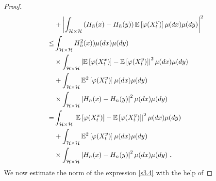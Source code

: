 \documentclass[review, onefignum, onetabnum]{siamart171218}
\begin{document}
\begin{proof}
\begin{equation}
\begin{aligned}
            &+
            \left|
                \int_{\mathcal{H}
                \times
                \mathcal{H}
                }
                \left(
                    H_{\bar n}(x) - H_{\bar n}(y)
                \right)
                \E\left[
                    \varphi(X_t ^ y)
                \right]
                \mu(dx)\mu(dy)
            \right|^2
            \\
            \le &
            \int_{\mathcal{H}\times \mathcal{H}}
                H_{\bar n}^2(x))
            \mu(dx)\mu(dy)
            \\
            &\times
                \int_{\mathcal{H}\times \mathcal{H}}
                \left|
                    \E\left [
                        \varphi(X_t^x)
                    \right]
                    -
                    \E\left[
                        \varphi(X_t^y)
                    \right]
                \right|^2
                \mu(dx)\mu(dy)
            \\
            &+
            \int_{\mathcal{H} \times \mathcal{H}}
                \E^2
                \left[
                    \varphi(X_t^y)
                \right]
            \mu(dx)\mu(dy)
            \\
             &\times
            \int_{\mathcal{H}\times \mathcal{H}}
            \left|
                H_{\bar n}(x)-H_{\bar n}(y)
            \right|^2
            \mu(dx)\mu(dy)
            \\
            =&
            \int_{\mathcal{H}\times \mathcal{H}}
            \left|
                    \E 
                    \left [
                        \varphi(X_t^x)
                    \right]
                    -
                    \E\left[
                        \varphi(X_t^y)
                    \right]
                \right|^2
                \mu(dx) \mu(dy)
            \\
            &+
            \int_{\mathcal{H}\times \mathcal{H}}
                \E^2
                \left[
                    \varphi(X_t^y)
                \right]
            \mu(dx)\mu(dy)
            \\
            & \times
            \int_{\mathcal{H}\times \mathcal{H}}
            \left|
                H_{\bar n}(x)
                    -
                    H_{\bar n}(y)
            \right|^2
            \mu(dx)\mu(dy)
        \ .
    \end{aligned}
    \label{s3.4.1}
\end{equation}
We now estimate the norm of the expression \eqref{s3.4} with the help of

\end{proof}
\end{document}
